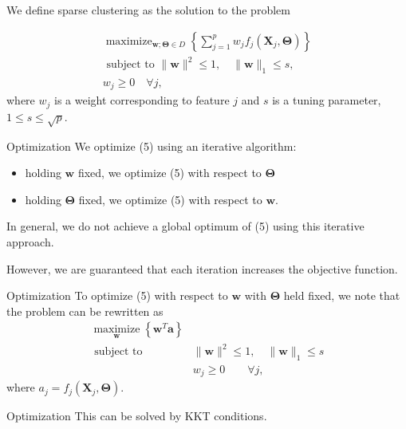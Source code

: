 \documentclass[12pt]{beamer}
\begin{document}
\begin{frame}
We define sparse clustering as the solution to the problem


\begin{equation}\tag{5}
\begin{array}{c}
\operatorname{maximize}_{\mathbf{w} ; \mathbf{\Theta} \in D}\left\{\sum_{j=1}^{p} w_{j} f_{j}\left(\mathbf{X}_{j}, \mathbf{\Theta}\right)\right\} \\
\text { subject to }\|\mathbf{w}\|^{2} \leq 1, \quad\|\mathbf{w}\|_{1} \leq s ,\\
w_{j} \geq 0 \quad \forall j ,
\end{array}
\end{equation}
where $w_j$ is a weight corresponding to feature $j$ and $s$ is a tuning parameter, $1\le s \le \sqrt{p}$.
\end{frame}

\begin{frame}{Optimization}
We optimize (5) using an iterative algorithm:
\begin{itemize}
\item holding $\mathbf{w}$ fixed, we optimize (5) with respect to $\mathbf{\Theta}$
\item holding $\mathbf{\Theta}$ fixed, we optimize (5) with respect to $\mathbf{w}$.
\end{itemize}
In general, we do not achieve a global optimum of (5) using this iterative approach.

However, we are guaranteed that each iteration increases the objective function.
\end{frame}

\begin{frame}{Optimization}
To optimize (5) with respect to $\mathbf{w}$ with $\mathbf{\Theta}$ held fixed, we note that the problem can be rewritten as
\begin{equation}\tag{6}
\begin{array}{cl}
\underset{\mathbf{w}}{\operatorname{maximize}}\left\{\mathbf{w}^{T} \mathbf{a}\right\} \\
\text { subject to } & \|\mathbf{w}\|^{2} \leq 1, \quad\|\mathbf{w}\|_{1} \leq s \\
 & w_{j} \geq 0 \qquad \forall j,
\end{array}
\end{equation}
where $a_j=f_j(\mathbf{X}_j,\mathbf{\Theta})$. 
\end{frame}

\begin{frame}{Optimization}
This can be solved by KKT conditions.
\end{frame}
\end{document}
